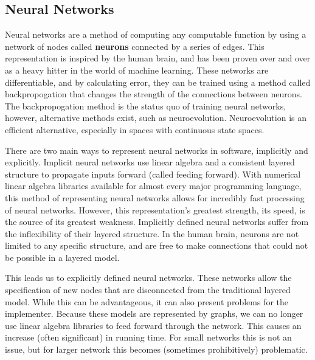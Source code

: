 \documentclass{article}
\begin{document}
\subsection{Neural Networks}
Neural networks are a method of computing any computable function by using a
network of nodes called \textbf{neurons} connected by a series of edges. This
representation is inspired by the human brain, and has been proven over and over
as a heavy hitter in the world of machine learning. These networks are
differentiable, and by calculating error, they can be trained using a method
called backpropogation that changes the strength of the connections between
neurons. The backpropogation method is the status quo of training neural
networks, however, alternative methods exist, such as neuroevolution.
Neuroevolution is an efficient alternative, especially in spaces with
continuous state spaces.

There are two main ways to represent neural networks in software, implicitly and
explicitly. Implicit neural networks use linear algebra and a consistent layered
structure to propagate inputs forward (called feeding forward). With numerical
linear algebra libraries available for almost every major programming language,
this method of representing neural networks allows for incredibly fast
processing
of neural networks. However, this representation's greatest strength, its speed,
is the source of its greatest weakness. Implicitly defined neural networks
suffer
from the inflexibility of their layered structure. In the human brain, neurons
are not limited to any specific structure, and are free to make connections
that could not be possible in a layered model.

This leads us to explicitly defined neural networks. These networks allow the
specification of new nodes that are disconnected from the traditional layered
model. While this can be advantageous, it can also present problems for the
implementer. Because these models are represented by graphs, we can no longer
use linear algebra libraries to feed forward through the network. This causes
an increase (often significant) in running time. For small networks this is
not an issue, but for larger network this becomes (sometimes prohibitively)
problematic.
\end{document}
